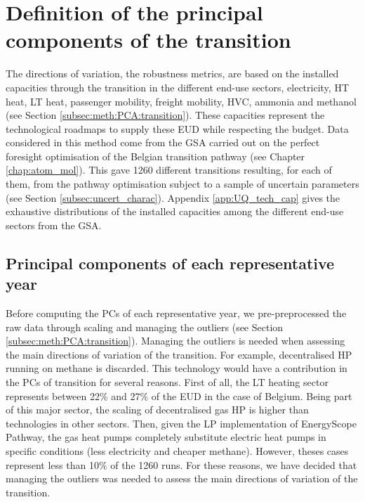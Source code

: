 \section{Definition of the principal components of the transition}
\label{sec:RobPol:PC_transition}
The directions of variation, \ie the robustness metrics, are based on the installed capacities through the transition in the different end-use sectors, \ie electricity, \gls{HT} heat, \gls{LT} heat, passenger mobility, freight mobility, \gls{HVC}, ammonia and methanol (see Section \ref{subsec:meth:PCA:transition}). These capacities represent the technological roadmaps to supply these \gls{EUD} while respecting the  budget.  Data considered in this method come from the \gls{GSA} carried out on the perfect foresight optimisation of the Belgian transition pathway (see Chapter \ref{chap:atom_mol}). This gave 1260 different transitions resulting, for each of them, from the pathway optimisation subject to a sample of uncertain parameters (see Section \ref{subsec:uncert_charac}). Appendix \ref{app:UQ_tech_cap} gives the exhaustive distributions of the installed capacities among the different end-use sectors from the \gls{GSA}.

\subsection{Principal components of each representative year}
\label{subsec:RobPol:PC_year}
Before computing the \gls{PCs} of each representative year, we pre-preprocessed the raw data through scaling and managing the outliers (see Section \ref{subsec:meth:PCA:transition}). Managing the outliers is needed when assessing the main directions of variation of the transition. For example, decentralised \gls{HP} running on methane is discarded. This technology would have a contribution in the \gls{PCs} of transition for several reasons. First of all, the \gls{LT} heating sector represents between 22\% and 27\% of the \gls{EUD} in the case of Belgium. Being part of this major sector, the scaling of decentralised gas \gls{HP} is higher than technologies in other sectors. Then, given the \gls{LP} implementation of EnergyScope Pathway, the gas heat pumps completely substitute electric heat pumps in specific conditions (less electricity and cheaper methane). However, theses cases represent less than 10\% of the 1260 runs. For these reasons, we have decided that managing the outliers was needed to assess the main directions of variation of the transition.

